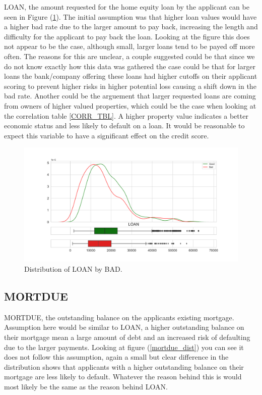 LOAN, the amount requested for the home equity loan by the applicant can be seen in Figure (\ref{loan_dist}). The initial assumption was that higher loan values would have a higher bad rate due to the larger amount to pay back, increasing the length and difficulty for the applicant to pay back the loan. Looking at the figure this does not appear to be the case, although small, larger loans tend to be payed off more often. The reasons for this are unclear, a couple suggested could be that since we do not know exactly how this data was gathered the case could be that for larger loans the bank/company offering these loans had higher cutoffs on their applicant scoring to prevent higher risks in higher potential loss causing a shift down in the bad rate. Another could be the arguement that larger requested loans are coming from owners of higher valued properties, which could be the case when looking at the correlation table \ref{CORR_TBL}. A higher property value indicates a better economic status and less likely to default on a loan. It would be reasonable to expect this variable to have a significant effect on the credit score.

\begin{figure}[!ht]
	\centering
	\includegraphics[scale=0.40]{figs/loan_dist.pdf}
	\caption{Distribution of LOAN by BAD. \label{loan_dist}}
\end{figure}

\subsection*{MORTDUE}

MORTDUE, the outstanding balance on the applicants existing mortgage. Assumption here would be similar to LOAN, a higher outstanding balance on their mortgage mean a large amount of debt and an increased risk of defaulting due to the larger payments. Looking at figure (\ref{mortdue_dist}) you can see it does not follow this assumption, again a small but clear difference in the distribution shows that applicants with a higher outstanding balance on their mortgage are less likely to default. Whatever the reason behind this is would most likely be the same as the reason behind LOAN.

